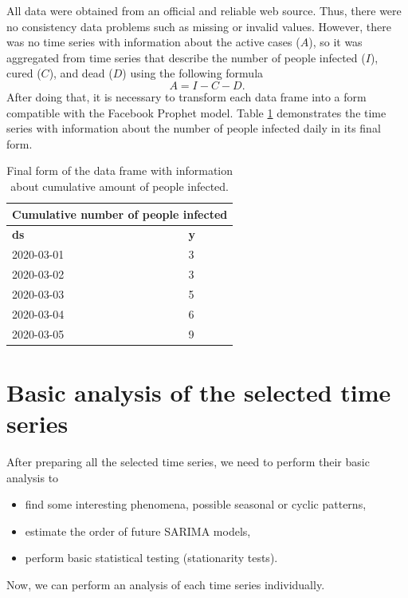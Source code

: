 All data were obtained from an official and reliable web source. Thus, there were no consistency data problems such as missing or invalid values. However, there was no time series with information about the active cases ($A$), so it was aggregated from time series that describe the number of people infected ($I$), cured ($C$), and dead ($D$) using the following formula
\begin{equation}
    A = I - C - D.
\end{equation}
After doing that, it is necessary to transform each data frame into a form compatible with the Facebook Prophet model. Table \ref{tab:cum_inf_example_table} demonstrates the time series with information about the number of people infected daily in its final form.

\begin{table}[!ht]
    \centering
    \begin{tabular}{|p{3cm}|p{3cm}|}
    \hline
     \multicolumn{2}{|c|}{\textbf{Cumulative number of people infected
     }} \\
    \hline
    \textbf{ds} & \textbf{y}\\
    \hline
    2020-03-01 & 3\\
    \hline
	2020-03-02 & 3\\
	\hline
	2020-03-03 & 5\\
	\hline
	2020-03-04 & 6\\
	\hline
    2020-03-05 & 9\\
 \hline
\end{tabular}
    \caption{Final form of the data frame with information about cumulative amount of people infected.}
    \label{tab:cum_inf_example_table}
\end{table}

\hypertarget{s3.2}{\section{Basic analysis of the selected time series}}

After preparing all the selected time series, we need to perform their basic analysis to 
\begin{itemize}
    \item find some interesting phenomena, possible seasonal or cyclic patterns,
    \item estimate the order of future SARIMA models,
    \item perform basic statistical testing (stationarity tests).
\end{itemize}
Now, we can perform an analysis of each time series individually.


